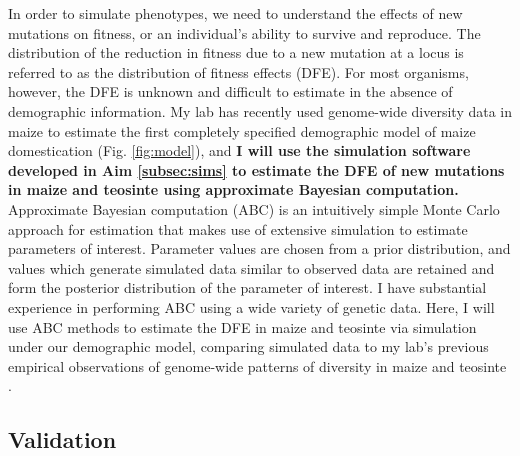 In order to simulate phenotypes, we need to understand the effects of new mutations on fitness, or an individual's ability to survive and reproduce.
%
%
The distribution of the reduction in fitness due to a new mutation at a locus is referred to as the distribution of fitness effects (DFE).
For most organisms, however, the DFE is unknown and difficult to estimate in the absence of demographic information.
My lab has recently used genome-wide diversity data in maize to estimate the first completely specified demographic model of maize domestication (Fig. \ref{fig:model}), and {\bf I will use the simulation software developed in Aim \ref{subsec:sims} to estimate the DFE of new mutations in maize and teosinte using approximate Bayesian computation.}
Approximate Bayesian computation (ABC) is an intuitively simple Monte Carlo approach for estimation that makes use of extensive simulation \citep{Beaumont2002} to estimate parameters of interest.
Parameter values are chosen from a prior distribution, and values which generate simulated data similar to observed data are retained and form the posterior distribution of the parameter of interest.  
I have substantial experience in performing ABC using a wide variety of genetic data\citep{Lockton2008,Ross-Ibarra2008,Ross-Ibarra_2009,Shi2010}.
Here, I will use ABC methods to estimate the DFE in maize and teosinte via simulation under our demographic model, comparing simulated data to my lab's previous empirical observations of genome-wide patterns of diversity in maize and teosinte \citep{Hufford2012b}.

\subsection{Validation} \label{subsec:validation}

